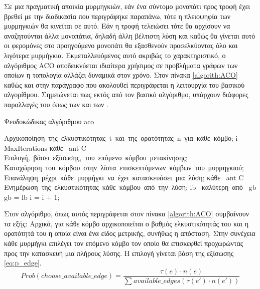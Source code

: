 \documentclass{assignment}
\begin{document}
Σε μια πραγματική αποικία μυρμηγκιών, εάν ένα σύντομο μονοπάτι προς τροφή έχει
βρεθεί με την διαδικασία που περιγράφηκε παραπάνω, τότε η πλειοψηφία των
μυρμηγκιών θα κινείται σε αυτό. Εάν η τροφή τελειώσει τότε θα αρχίσουν να 
αναζητούνται άλλα μονοπάτια, δηλαδή άλλη βέλτιστη λύση και καθώς θα γίνεται
αυτό οι φερομόνες στο προηγούμενο μονοπάτι θα εξασθενούν προσελκύοντας όλο και
λιγότερα μυρμήγκια. Εκμεταλλευόμενος αυτό ακριβώς το χαρακτηριστικό, ο
αλγόριθμος ACO αποδεικνύεται ιδιαίτερα χρήσιμος σε προβλήματα γράφων των οποίων
η τοπολογία αλλάζει δυναμικά στον χρόνο. Στον πίνακα \ref{algorith:ACO}
καθώς και στην παράγραφο που ακολουθεί περιγράφεται η λειτουργία του βασικού
αλγορίθμου. Σημειώνεται πως εκτός από τον βασικό αλγόριθμο, υπάρχουν διάφορες
παραλλαγές του όπως των \citet{merkle2002ant} και των \citet{yaseen2008ant}.
\begin{algorithm}                        %
\caption{Ψευδοκώδικας αλγόριθμου aco}          %
\label{algorith:ACO}                      %
\begin{program}
\mbox{Αρχικοποίηση της ελκυστικότητας t και της ορατότητας n για κάθε κόμβο};
  \WHILE i \lt MaxIterations \DO
    \FOR \mbox{κάθε } ant \in C \DO
    \mbox{Επιλογή, βάσει εξίσωσης, του επόμενο κόμβου μετακίνησης;}
    \mbox{Καταχώρηση του κόμβου στην λίστα επισκεπτόμενων κόμβων του μυρμηγκιού;}
    \mbox{Eπανάληψη μέχρι κάθε μυρμήγκι να έχει κατασκευάσει μια λύση;}
  \END
  \FOR \mbox{κάθε } ant \in C \DO
  \mbox{Ενημέρωση της ελκυστικότητας κάθε κόμβου από την λύση;}
  \END
  \IF lb \mbox{ καλύτερη από } gb
    \THEN gb = lb
   \FI
   i = i + 1;
  \END
\end{program}
\end{algorithm}

Στον αλγόριθμο, όπως αυτός περιγράφεται στον πίνακα \ref{algorith:ACO}\cite{web:ucla15}
συμβαίνουν τα εξής: Αρχικά, για κάθε κόμβο αρχικοποιείται ο βαθμός
ελκυστικότητάς του και η ορατότητά του η οποία είναι ένα είδος μετρικής, συνήθως
η απόσταση. Στην συνέχεια κάθε μυρμήγκι επιλέγει τον επόμενο κόμβο τον οποίο
θα επισκεφθεί προχωρώντας προς την κατασκευή μια πλήρους λύσης. Η επιλογή
γίνεται βάση της εξίσωσης \ref{eq:p_edge}.
\begin{equation}
\label{eq:p_edge}
Prob(choose\_available\_edge) = \frac{\tau(e) \cdot n(e)}{\sum_{} available\_edges(\tau(e') \cdot n(e'))}
\end{equation}
\end{document}
